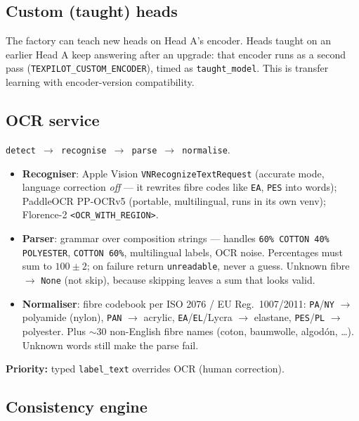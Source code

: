 \documentclass[11pt,a4paper]{article}
\begin{document}
\subsection{Custom (taught) heads}

The factory can teach new heads on Head A's encoder. Heads taught on an earlier
Head A keep answering after an upgrade: that encoder runs as a second pass
(\texttt{TEXPILOT\_CUSTOM\_ENCODER}), timed as \texttt{taught\_model}. This is
transfer learning with encoder-version compatibility.

\subsection{OCR service}

\texttt{detect $\to$ recognise $\to$ parse $\to$ normalise}.

\begin{itemize}[leftmargin=*]
  \item \textbf{Recogniser}: Apple Vision \texttt{VNRecognizeTextRequest} (accurate
        mode, language correction \emph{off} --- it rewrites fibre codes like
        \texttt{EA}, \texttt{PES} into words); PaddleOCR PP-OCRv5 (portable,
        multilingual, runs in its own venv); Florence-2 \texttt{<OCR\_WITH\_REGION>}.
  \item \textbf{Parser}: grammar over composition strings --- handles
        \texttt{60\% COTTON 40\% POLYESTER}, \texttt{COTTON 60\%}, multilingual
        labels, OCR noise. Percentages must sum to $100 \pm 2$; on failure return
        \texttt{unreadable}, never a guess. Unknown fibre $\to$ \texttt{None}
        (not skip), because skipping leaves a sum that looks valid.
  \item \textbf{Normaliser}: fibre codebook per ISO 2076 / EU Reg.\ 1007/2011:
        \texttt{PA}/\texttt{NY} $\to$ polyamide (nylon), \texttt{PAN} $\to$ acrylic,
        \texttt{EA}/\texttt{EL}/Lycra $\to$ elastane, \texttt{PES}/\texttt{PL}
        $\to$ polyester. Plus $\sim$30 non-English fibre names (coton, baumwolle,
        algod\'on, \dots). Unknown words still make the parse fail.
\end{itemize}

\textbf{Priority:} typed \texttt{label\_text} overrides OCR (human correction).

\subsection{Consistency engine}
\end{document}
